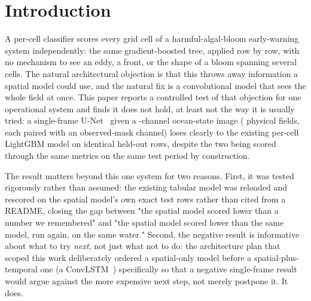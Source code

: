 %

\section{Introduction}

A per-cell classifier scores every grid cell of a harmful-algal-bloom
early-warning system independently: the same gradient-boosted tree, applied
row by row, with no mechanism to see an eddy, a front, or the shape of a
bloom spanning several cells. The natural architectural objection is that
this throws away information a spatial model could use, and the natural fix
is a convolutional model that sees the whole field at once. This paper
reports a controlled test of that objection for one operational system and
finds it does not hold, at least not the way it is usually tried: a
single-frame U-Net~\citep{ronneberger2015} given a \NInputChannels{}-channel
ocean-state image (\NChannels{} physical fields, each paired with an
observed-mask channel) loses clearly to the existing per-cell LightGBM
model on \NTestRows{} identical held-out rows, despite the two being scored
through the same metrics on the same test period by construction.

The result matters beyond this one system for two reasons. First, it was
tested rigorously rather than assumed: the existing tabular model was
reloaded and rescored on the spatial model's own exact test rows rather than
cited from a README, closing the gap between "the spatial model scored
lower than a number we remembered" and "the spatial model scored lower than
the same model, run again, on the same water." Second, the negative result
is informative about what to try \emph{next}, not just what not to do: the
architecture plan that scoped this work deliberately ordered a spatial-only
model before a spatial-plus-temporal one (a
ConvLSTM~\citep{shi2015}) specifically so that a negative single-frame
result would argue against the more expensive next step, not merely
postpone it. It does.

